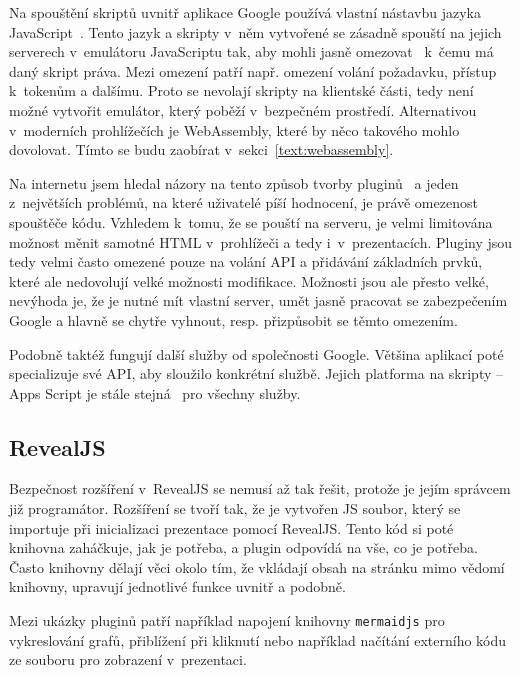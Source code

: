 Na spouštění skriptů uvnitř aplikace Google používá vlastní nástavbu jazyka JavaScript~\cite{google_apps}.
Tento jazyk a skripty v~něm vytvořené se zásadně spouští na jejich serverech v~emulátoru JavaScriptu tak, aby mohli jasně omezovat~\cite{google_apps} k~čemu má daný skript práva. 
Mezi omezení patří např. omezení volání požadavku, přístup k~tokenům a dalšímu.
Proto se nevolají skripty na klientské části, tedy není možné vytvořit emulátor, který poběží v~bezpečném prostředí.
Alternativou v~moderních prohlížečích je WebAssembly, které by něco takového mohlo dovolovat.
Tímto se budu zaobírat v~sekci~\ref{text:webassembly}.

Na internetu jsem hledal názory na tento způsob tvorby pluginů~\cite{google_apps_script_redit} a jeden z~největších problémů, na které uživatelé píší hodnocení, je právě omezenost spouštěče kódu.
Vzhledem k~tomu, že se pouští na serveru, je velmi limitována možnost měnit samotné HTML v~prohlížeči a tedy i~v~prezentacích.
Pluginy jsou tedy velmi často omezené pouze na volání API a přidávání základních prvků, které ale nedovolují velké možnosti modifikace.
Možnosti jsou ale přesto velké, nevýhoda je, že je nutné mít vlastní server, umět jasně pracovat se zabezpečením Google a hlavně se chytře vyhnout, resp. přizpůsobit se těmto omezením.

Podobně taktéž fungují další služby od společnosti Google.
Většina aplikací poté specializuje své API, aby sloužilo konkrétní službě.
Jejich platforma na skripty -- Apps Script je stále stejná~\cite{google_apps_script_redit, google_apps} pro všechny služby.

\subsection{RevealJS}

Bezpečnost rozšíření v~RevealJS se nemusí až tak řešit, protože je jejím správcem již programátor.
Rozšíření se tvoří tak, že je vytvořen JS soubor, který se importuje při inicializaci prezentace pomocí RevealJS.
Tento kód si poté knihovna zaháčkuje, jak je potřeba, a plugin odpovídá na vše, co je potřeba.
Často knihovny dělají věci okolo tím, že vkládají obsah na stránku mimo vědomí knihovny, upravují jednotlivé funkce uvnitř a podobně.

Mezi ukázky pluginů patří například napojení knihovny \texttt{mermaidjs} pro vykreslování grafů, přiblížení při kliknutí nebo například načítání externího kódu ze souboru pro zobrazení v~prezentaci.

